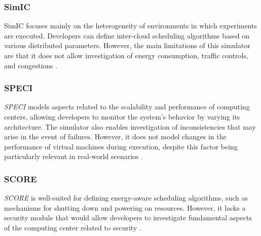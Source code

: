 {\subsubsection*{SimIC}
SimIC \cite{sotiriadis2013simic} focuses mainly on the heterogeneity of environments in which experiments are executed. Developers can define inter-cloud scheduling algorithms based on various distributed parameters. However, the main limitations of this simulator are that it does not allow investigation of energy consumption, traffic controls, and congestions \cite{mansouri2020cloud}.
\subsubsection*{SPECI}
\emph{SPECI} \cite{sriram2009speci} models aspects related to the scalability and performance of computing centers, allowing developers to monitor the system's behavior by varying its architecture. The simulator also enables investigation of inconsistencies that may arise in the event of failures. However, it does not model changes in the performance of virtual machines during execution, despite this factor being particularly relevant in real-world scenarios \cite{mansouri2020cloud}.

\subsubsection*{SCORE}
\emph{SCORE} \cite{fernandez2018score} is well-suited for defining energy-aware scheduling algorithms, such as mechanisms for shutting down and powering on resources. However, it lacks a security module that would allow developers to investigate fundamental aspects of the computing center related to security \cite{mansouri2020cloud}.


}
